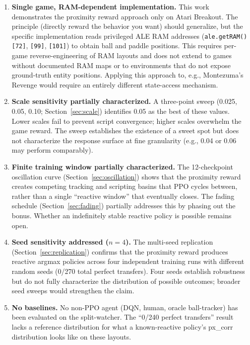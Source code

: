 \documentclass[11pt]{article}
\begin{document}
\begin{enumerate}
    \item \textbf{Single game, RAM-dependent implementation.} This work
    demonstrates the proximity reward approach only on Atari Breakout. The
    principle (directly reward the behavior you want) should generalize, but
    the specific implementation reads privileged ALE RAM addresses
    (\texttt{ale.getRAM()[72]}, \texttt{[99]}, \texttt{[101]}) to obtain
    ball and paddle positions. This requires per-game reverse-engineering
    of RAM layouts and does not extend to games without documented RAM maps
    or to environments that do not expose ground-truth entity positions.
    Applying this approach to, e.g., Montezuma's Revenge would require an
    entirely different state-access mechanism.

    \item \textbf{Scale sensitivity partially characterized.} A three-point
    sweep (0.025, 0.05, 0.10; Section~\ref{sec:scale}) identifies 0.05 as the
    best of these values. Lower scales fail to prevent script convergence;
    higher scales overwhelm the game reward. The sweep establishes the
    existence of a sweet spot but does not characterize the response surface
    at fine granularity (e.g., 0.04 or 0.06 may perform comparably).

    \item \textbf{Finite training window partially characterized.} The
    12-checkpoint oscillation curve (Section~\ref{sec:oscillation}) shows that
    the proximity reward creates competing tracking and scripting basins that
    PPO cycles between, rather than a single ``reactive window'' that
    eventually closes. The fading schedule (Section~\ref{sec:fading})
    partially addresses this by phasing out the bonus. Whether an
    indefinitely stable reactive policy is possible remains open.

    \item \textbf{Seed sensitivity addressed ($n=4$).} The multi-seed
    replication (Section~\ref{sec:replication}) confirms that the proximity
    reward produces reactive argmax policies across four independent training
    runs with different random seeds (0/270 total perfect transfers). Four
    seeds establish robustness but do not fully characterize the distribution
    of possible outcomes; broader seed sweeps would strengthen the claim.

    \item \textbf{No baselines.} No non-PPO agent (DQN, human, oracle
    ball-tracker) has been evaluated on the split-watcher. The ``0/240
    perfect transfers'' result lacks a reference distribution for what a
    known-reactive policy's px\_corr distribution looks like on these layouts.


\end{enumerate}
\end{document}
